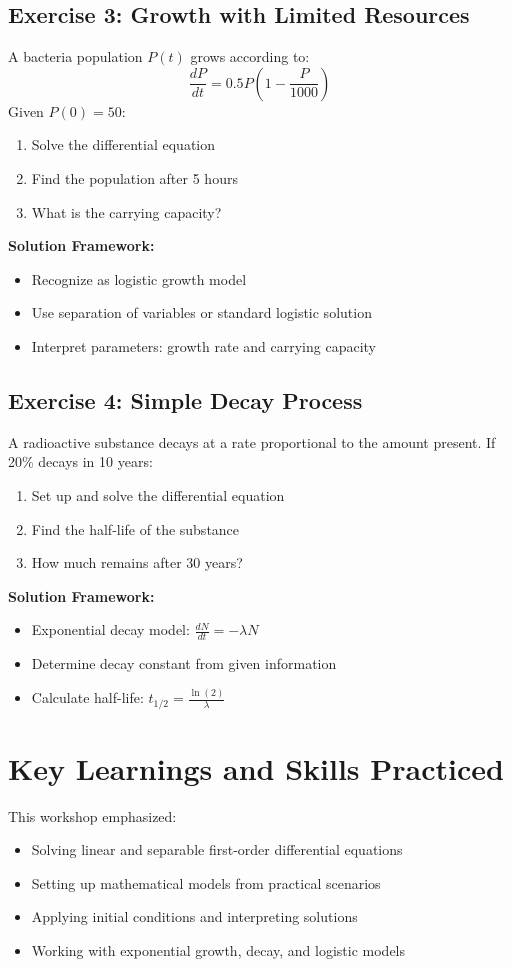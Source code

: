\documentclass[12pt, letterpaper]{book}
\begin{document}
\subsection{Exercise 3: Growth with Limited Resources}
A bacteria population $P(t)$ grows according to:
$$\frac{dP}{dt} = 0.5P\left(1-\frac{P}{1000}\right)$$
Given $P(0) = 50$:
\begin{enumerate}
    \item Solve the differential equation
    \item Find the population after 5 hours
    \item What is the carrying capacity?
\end{enumerate}

\textbf{Solution Framework:}
\begin{itemize}
    \item Recognize as logistic growth model
    \item Use separation of variables or standard logistic solution
    \item Interpret parameters: growth rate and carrying capacity
\end{itemize}

\subsection{Exercise 4: Simple Decay Process}
A radioactive substance decays at a rate proportional to the amount present. If 20\% decays in 10 years:
\begin{enumerate}
    \item Set up and solve the differential equation
    \item Find the half-life of the substance
    \item How much remains after 30 years?
\end{enumerate}

\textbf{Solution Framework:}
\begin{itemize}
    \item Exponential decay model: $\frac{dN}{dt} = -\lambda N$
    \item Determine decay constant from given information
    \item Calculate half-life: $t_{1/2} = \frac{\ln(2)}{\lambda}$
\end{itemize}

\section{Key Learnings and Skills Practiced}
This workshop emphasized:
\begin{itemize}
    \item Solving linear and separable first-order differential equations
    \item Setting up mathematical models from practical scenarios
    \item Applying initial conditions and interpreting solutions
    \item Working with exponential growth, decay, and logistic models
\end{itemize}
\end{document}
